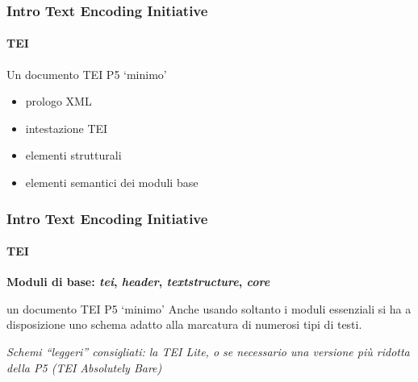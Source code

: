 
\begin{frame}
	\frametitle{Intro Text Encoding Initiative}
	\framesubtitle{TEI}
	\addtocounter{nframe}{1}

	\begin{block}{Un documento TEI P5 ‘minimo’}
        \begin{itemize}
            \item prologo XML
            \item intestazione TEI
            \item elementi strutturali
            \item elementi semantici dei moduli base
        \end{itemize}
    \end{block}
    
\end{frame}

\begin{frame}
	\frametitle{Intro Text Encoding Initiative}
	\framesubtitle{TEI}
	\addtocounter{nframe}{1}

   \textbf{ Moduli di base: \textit{tei}, \textit{header}, \textit{textstructure}, \textit{core}}

	\begin{block}{un documento TEI P5 ‘minimo’}
        Anche usando soltanto i moduli essenziali si ha a disposizione
        uno schema adatto alla marcatura di numerosi tipi di testi.
    \end{block}
 
       \textit{Schemi ``leggeri'' consigliati: la TEI Lite, o se necessario una
        versione più ridotta della P5 (TEI
        Absolutely Bare)}
\end{frame}




